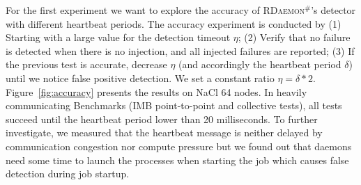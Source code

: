 \documentclass[sigconf]{acmart}
\newcommand{\ourwork}[0]{\textsc{RDaemon}\ensuremath{^\#}\xspace}
\newcommand{\imb}[0]{\textsc{IMB}\xspace}
\begin{document}
For the first experiment we want to explore the accuracy of \ourwork's detector with different heartbeat periods.
%
The accuracy experiment is conducted by (1) Starting with a large value for the
detection timeout $\eta$; (2) Verify that no failure is detected when there is no injection, and all injected failures are reported; (3) If the previous test is accurate, decrease $\eta$ (and accordingly the heartbeat period $\delta$) until we notice false positive detection. We set a constant ratio $\eta = \delta * 2$.
 Figure~\ref{fig:accuracy} presents the results on NaCl 64 nodes.
 In heavily communicating Benchmarks
 (\imb point-to-point and collective tests), all tests succeed until the
  heartbeat period lower than 20 milliseconds. To further investigate,
  we measured that the heartbeat message is neither delayed by communication
  congestion nor compute pressure but we found out that daemons need some time to launch the processes when starting the job which causes false detection during job startup.
  

\end{document}

